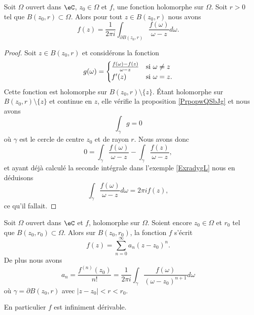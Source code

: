 \begin{theorem}   \label{ThoUHztQe}
    Soit \( \Omega\) ouvert dans \( \eC\), \( z_0\in \Omega\) et \( f\), une fonction holomorphe sur \( \Omega\). Soit \( r>0\) tel que \( B(z_0,r)\subset \Omega\). Alors pour tout \( z\in B(z_0,r)\) nous avons
    \begin{equation}    \label{EqPzUABM}
        f(z)=\frac{1}{ 2\pi i }\int_{\partial B(z_0,r)}\frac{ f(\omega) }{ \omega-z }d\omega.
    \end{equation}
\end{theorem}

\begin{proof}
    Soit \( z\in B(z_0,r)\) et considérons la fonction
    \begin{equation}
        g(\omega)=\begin{cases}
            \frac{ f(\omega)-f(z) }{ \omega-z }    &   \text{si \( \omega\neq z\)}\\
            f'(z)    &    \text{si \( \omega=z\)}.
        \end{cases}
    \end{equation}
    Cette fonction est holomorphe sur \( B(z_0,r)\setminus\{ z \}\). Étant holomorphe sur \( B(z_0,r)\setminus\{ z \}\) et continue en \( z\), elle vérifie la proposition \ref{PrpopwQSbJg} et nous avons
    \begin{equation}
        \int_{\gamma}g=0
    \end{equation}
    où \( \gamma\) est le cercle de centre \( z_0\) et de rayon \( r\). Nous avons donc
    \begin{equation}
        0=\int_{\gamma}\frac{ f(\omega) }{ \omega-z }-\int_{\gamma}\frac{ f(z) }{ \omega-z },
    \end{equation}
    et ayant déjà calculé la seconde intégrale dans l'exemple \ref{ExradygL} nous en déduisons
    \begin{equation}
        \int_{\gamma}\frac{ f(\omega) }{ \omega-z }d\omega=2\pi if(z),
    \end{equation}
    ce qu'il fallait.
\end{proof}


\begin{theorem}     \label{ThomcPOdd}
    Soit \( \Omega\) ouvert dans \( \eC\) et \( f\), holomorphe sur \( \Omega\). Soient encore \( z_0\in \Omega\) et \( r_0\) tel que \( B(z_0,r_0)\subset \Omega\). Alors sur \( B(z_0,r_0)\), la fonction \( f\) s'écrit
    \begin{equation}
        f(z)=\sum_{n=0}^{\infty}a_n(z-z_0)^n.
    \end{equation}
    De plus nous avons
    \begin{equation}
        a_n=\frac{ f^{(n)}(z_0) }{ n! }=\frac{1}{ 2\pi i }\int_{\gamma}\frac{ f(\omega) }{ (\omega-z_0)^{n+1} }d\omega
    \end{equation}
    où \( \gamma=\partial B(z_0,r)\) avec \( | z-z_0 |<r<r_0\).

    En particulier \( f\) est infiniment dérivable.
\end{theorem}

